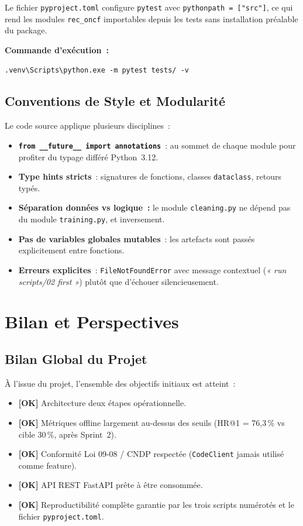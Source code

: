 \documentclass[11pt, a4paper]{article}
\begin{document}
Le fichier \texttt{pyproject.toml} configure \texttt{pytest} avec
\texttt{pythonpath~=~["src"]}, ce qui rend les modules
\texttt{rec\_oncf} importables depuis les tests sans installation
préalable du package.

\textbf{Commande d'exécution~:}
\begin{lstlisting}[style=sh]
.venv\Scripts\python.exe -m pytest tests/ -v
\end{lstlisting}

\subsection{Conventions de Style et Modularité}

Le code source applique plusieurs disciplines~:
\begin{itemize}
\item \textbf{\texttt{from \_\_future\_\_ import annotations}}~: au
    sommet de chaque module pour profiter du typage différé Python~3.12.
\item \textbf{Type hints stricts}~: signatures de fonctions, classes
    \texttt{dataclass}, retours typés.
\item \textbf{Séparation données vs logique~:} le module
    \texttt{cleaning.py} ne dépend pas du module \texttt{training.py},
    et inversement.
\item \textbf{Pas de variables globales mutables}~: les artefacts sont
    passés explicitement entre fonctions.
\item \textbf{Erreurs explicites}~: \texttt{FileNotFoundError} avec
    message contextuel (\textit{« run scripts/02 first »}) plutôt que
    d'échouer silencieusement.
\end{itemize}

\newpage
\section{Bilan et Perspectives}

\subsection{Bilan Global du Projet}

À l'issue du projet, l'ensemble des objectifs initiaux est atteint~:
\begin{itemize}
\item \textbf{[OK]} Architecture deux étapes opérationnelle.
\item \textbf{[OK]} Métriques offline largement au-dessus des seuils
    (HR@1 = 76{,}3\,\% vs cible 30\,\%, après Sprint~2).
\item \textbf{[OK]} Conformité Loi 09-08 / CNDP respectée
    (\texttt{CodeClient} jamais utilisé comme feature).
\item \textbf{[OK]} API REST FastAPI prête à être consommée.
\item \textbf{[OK]} Reproductibilité complète garantie par les trois scripts
    numérotés et le fichier \texttt{pyproject.toml}.
\end{itemize}
\end{document}

